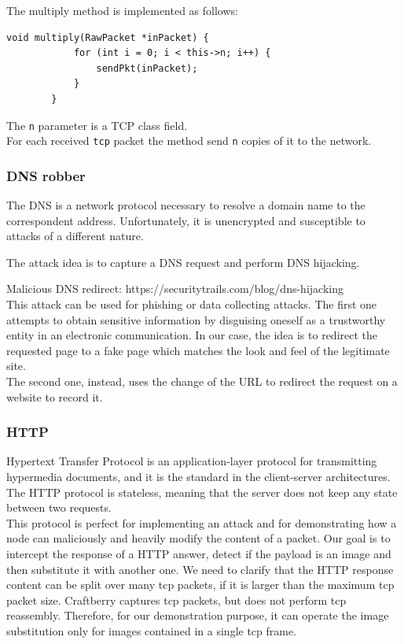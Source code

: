 \documentclass[12pt]{article}
\begin{document}
	The multiply method is implemented as follows:
	\begin{lstlisting}[frame=single]
		void multiply(RawPacket *inPacket) {
			for (int i = 0; i < this->n; i++) {
				sendPkt(inPacket);
			}
		}
	\end{lstlisting}

	The \lstinline{n} parameter is a TCP class field.\\
	For each received \lstinline{tcp} packet the method send \lstinline{n} copies of it to the network.

	\subsubsection{DNS robber}

	The DNS is a network protocol necessary to resolve a domain name to the correspondent address. Unfortunately, it is unencrypted and susceptible to attacks of a different nature. 

	The attack idea is to capture a DNS request and perform DNS hijacking.

	Malicious DNS redirect: https://securitytrails.com/blog/dns-hijacking\\

	This attack can be used for phishing or data collecting attacks. The first one attempts to obtain sensitive information by disguising oneself as a trustworthy entity in an electronic communication. In our case, the idea is to redirect the requested page to a fake page which matches the look and feel of the legitimate site.\\
	The second one, instead, uses the change of the URL to redirect the request on a website to record it.

	\subsubsection{HTTP}

	Hypertext Transfer Protocol is an application-layer protocol for transmitting hypermedia documents, and it is the standard in the client-server architectures. The HTTP protocol is stateless, meaning that the server does not keep any state between two requests.\\
	This protocol is perfect for implementing an attack and for demonstrating how a node can maliciously and heavily modify the content of a packet. Our goal is to intercept the response of a HTTP answer, detect if the payload is an image and then substitute it with another one. We need to clarify that the HTTP response content can be split over many tcp packets, if it is larger than the maximum tcp packet size. Craftberry captures tcp packets, but does not perform tcp reassembly. Therefore, for our demonstration purpose, it can operate the image substitution only for images contained in a single tcp frame.
\end{document}
